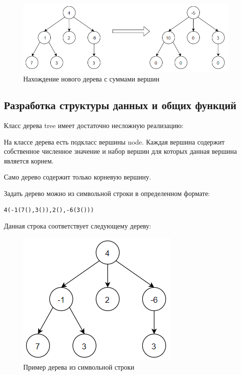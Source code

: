 \documentclass[14pt,a4paper,report]{report}
\begin{document}
\begin{figure}[h!]
	\centering
	\includegraphics[scale = 0.7]{images/1.png}
	\caption{Нахождение нового дерева с суммами вершин}
	\label{image:1}
\end{figure}

\subsection{Разработка структуры данных и общих функций}

Класс дерева tree имеет достаточно несложную реализацию:



На классе дерева есть подкласс вершины node. Каждая вершина содержит собственное численное значение и набор вершин для которых данная вершина является корнем.

Само дерево содержит только корневую вершину.

Задать дерево можно из символьной строки в определенном формате:

\begin{verbatim}
4(-1(7(),3()),2(),-6(3()))
\end{verbatim}

Данная строка соответствует следующему дереву:

\begin{figure}[h!]
	\centering
	\includegraphics[scale = 0.7]{images/2.png}
	\caption{Пример дерева из символьной строки}
	\label{image:2}
\end{figure}
\end{document}
